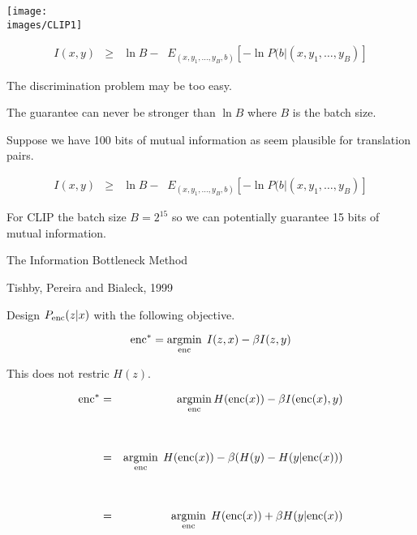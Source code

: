 {

\centerline{\texttt{[image: \\images/CLIP1]}}


{\huge
\begin{eqnarray*}
I(x,y) & \geq & \ln B - \;\;E_{(x,y_1,\ldots,y_B,b)}\left[-\ln P(b|(x,y_1,\ldots,y_B)\right]
\end{eqnarray*}
}

The discrimination problem may be too easy.

\vfill
The guarantee can never be stronger than $\ln B$ where $B$ is the batch size.

\vfill
Suppose we have 100 bits of mutual information as seem plausible for translation pairs.


\begin{eqnarray*}
I(x,y) & \geq & \ln B - \;\;E_{(x,y_1,\ldots,y_B,b)}\left[-\ln P(b|(x,y_1,\ldots,y_B)\right]
\end{eqnarray*}

\vfill
For CLIP the batch size $B = 2^{15}$ so we can potentially guarantee 15 bits of mutual information.


\centerline{The Information Bottleneck Method}
\centerline{Tishby, Pereira and Bialeck, 1999}

\vfill
Design $P_{\mathrm{enc}}(z|x)$ with the following objective.

\vfill
$$\mathrm{enc}^* = \operatorname*{argmin}_{\mathrm{enc}}\;I(z,x) - \beta I(z,y)$$

\vfill
This does not restric $H(z)$.


\vfill
\begin{eqnarray*}
\mathrm{enc}^* & = & \operatorname*{argmin}_{\mathrm{enc}} H(\mathrm{enc}(x)) - \beta I(\mathrm{enc}(x),y)\\
\\
\\
& = & \operatorname*{argmin}_{\mathrm{enc}}\;H(\mathrm{enc}(x)) - \beta(H(y) - H(y|\mathrm{enc}(x))) \\
\\
\\
& = & \operatorname*{argmin}_{\mathrm{enc}}\;H(\mathrm{enc}(x)) + \beta H(y|\mathrm{enc}(x))
\end{eqnarray*}


}
